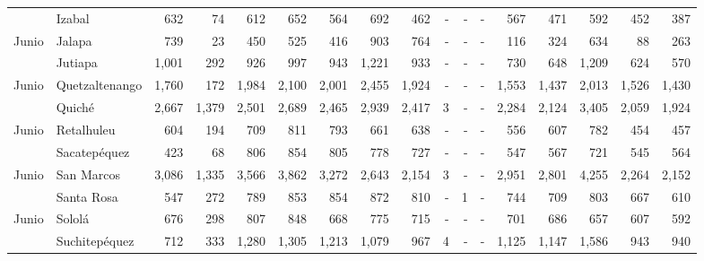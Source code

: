\begin{landscape}
\begin{center}
\begin{longtable}{llrrrrrrrrrrrrrrr}
\rowcolor{color1!5!white}\multicolumn{1}{l}{	\footnotesize	 Junio 	}&	 Izabal 	&	 632 	&	 74 	&	 612 	&	 652 	&	 564 	&	 692 	&	 462 	&	 -   	&	 -   	&	 -   	&	 567 	&	 471 	&	 592 	&	 452 	&	 387 	\\
\multicolumn{1}{l}{	\footnotesize	 Junio 	}&	 Jalapa 	&	 739 	&	 23 	&	 450 	&	 525 	&	 416 	&	 903 	&	 764 	&	 -   	&	 -   	&	 -   	&	 116 	&	 324 	&	 634 	&	 88 	&	 263 	\\
\rowcolor{color1!5!white}\multicolumn{1}{l}{	\footnotesize	 Junio 	}&	 Jutiapa 	&	 1,001 	&	 292 	&	 926 	&	 997 	&	 943 	&	 1,221 	&	 933 	&	 -   	&	 -   	&	 -   	&	 730 	&	 648 	&	 1,209 	&	 624 	&	 570 	\\
\multicolumn{1}{l}{	\footnotesize	 Junio 	}&	 Quetzaltenango 	&	 1,760 	&	 172 	&	 1,984 	&	 2,100 	&	 2,001 	&	 2,455 	&	 1,924 	&	 -   	&	 -   	&	 -   	&	 1,553 	&	 1,437 	&	 2,013 	&	 1,526 	&	 1,430 	\\
\rowcolor{color1!5!white}\multicolumn{1}{l}{	\footnotesize	 Junio 	}&	 Quiché 	&	 2,667 	&	 1,379 	&	 2,501 	&	 2,689 	&	 2,465 	&	 2,939 	&	 2,417 	&	 3 	&	 -   	&	 -   	&	 2,284 	&	 2,124 	&	 3,405 	&	 2,059 	&	 1,924 	\\
\multicolumn{1}{l}{	\footnotesize	 Junio 	}&	 Retalhuleu 	&	 604 	&	 194 	&	 709 	&	 811 	&	 793 	&	 661 	&	 638 	&	 -   	&	 -   	&	 -   	&	 556 	&	 607 	&	 782 	&	 454 	&	 457 	\\
\rowcolor{color1!5!white}\multicolumn{1}{l}{	\footnotesize	 Junio 	}&	 Sacatepéquez 	&	 423 	&	 68 	&	 806 	&	 854 	&	 805 	&	 778 	&	 727 	&	 -   	&	 -   	&	 -   	&	 547 	&	 567 	&	 721 	&	 545 	&	 564 	\\
\multicolumn{1}{l}{	\footnotesize	 Junio 	}&	 San Marcos 	&	 3,086 	&	 1,335 	&	 3,566 	&	 3,862 	&	 3,272 	&	 2,643 	&	 2,154 	&	 3 	&	 -   	&	 -   	&	 2,951 	&	 2,801 	&	 4,255 	&	 2,264 	&	 2,152 	\\
\rowcolor{color1!5!white}\multicolumn{1}{l}{	\footnotesize	 Junio 	}&	 Santa Rosa 	&	 547 	&	 272 	&	 789 	&	 853 	&	 854 	&	 872 	&	 810 	&	 -   	&	 1 	&	 -   	&	 744 	&	 709 	&	 803 	&	 667 	&	 610 	\\
\multicolumn{1}{l}{	\footnotesize	 Junio 	}&	 Sololá 	&	 676 	&	 298 	&	 807 	&	 848 	&	 668 	&	 775 	&	 715 	&	 -   	&	 -   	&	 -   	&	 701 	&	 686 	&	 657 	&	 607 	&	 592 	\\
\rowcolor{color1!5!white}\multicolumn{1}{l}{	\footnotesize	 Junio 	}&	 Suchitepéquez 	&	 712 	&	 333 	&	 1,280 	&	 1,305 	&	 1,213 	&	 1,079 	&	 967 	&	 4 	&	 -   	&	 -   	&	 1,125 	&	 1,147 	&	 1,586 	&	 943 	&	 940 	\\

\end{longtable}
\end{center}
\end{landscape}
